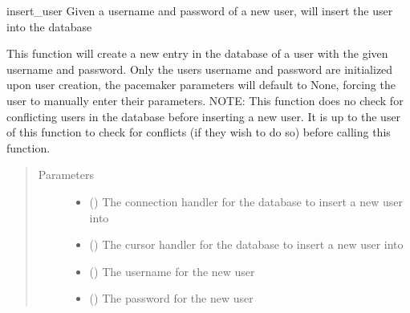 \documentclass[letterpaper,10pt,english]{sphinxmanual}
\begin{document}
\begin{fulllineitems}
\label{\detokenize{flaskapp.data:flaskapp.data.database.insert_user}}
insert\_user Given a username and password of a new user, will insert the user into the database

This function will create a new entry in the database of a user with the given username and password.
Only the users username and password are initialized upon user creation, the pacemaker parameters will
default to None, forcing the user to manually enter their parameters.
NOTE: This function does no check for conflicting users in the database before inserting a new user.
It is up to the user of this function to check for conflicts (if they wish to do so) before calling
this function.
\begin{quote}\begin{description}
\item[{Parameters}] \leavevmode\begin{itemize}
\item {} 
 () \textendash{} The connection handler for the database to insert a new user into

\item {} 
 () \textendash{} The cursor handler for the database to insert a new user into

\item {} 
 () \textendash{} The username for the new user

\item {} 
 () \textendash{} The password for the new user

\end{itemize}

\end{description}\end{quote}

\end{fulllineitems}
\end{document}
